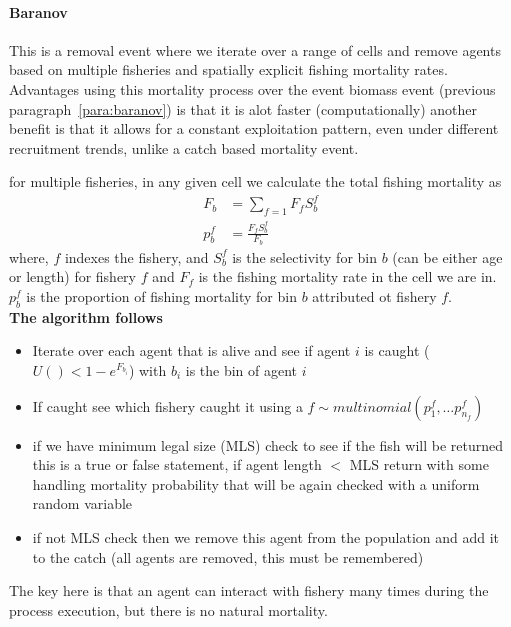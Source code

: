 \paragraph{Baranov}\label{para:event_mort_baranov}
This is a removal event where we iterate over a range of cells and remove agents based on multiple fisheries and spatially explicit fishing mortality rates. Advantages using this mortality process over the event biomass event (previous paragraph~\ref{para:baranov}) is that it is alot faster (computationally) another benefit is that it allows for a constant exploitation pattern, even under different recruitment trends, unlike a catch based mortality event.

for multiple fisheries, in any given cell we calculate the total fishing mortality as
\begin{align}
	F_b &= \sum_{f = 1} F_fS^f_b\\
	p^f_b &= \frac{F_fS^f_b}{F_b}
\end{align}
where, \(f\) indexes the fishery, and \(S^f_b\) is the selectivity for bin \(b\) (can be either age or length) for fishery \(f\) and \(F_f\) is the fishing mortality rate in the cell we are in. \(p^f_b\) is the proportion of fishing mortality for bin \(b\) attributed ot fishery \(f\).\\
\textbf{The algorithm follows}
\begin{itemize}
	\item Iterate over each agent that is alive and see if agent \(i\) is caught ($U() < 1 - e^{F_{b_i}}$) with \(b_i\) is the bin of agent \(i\)
	\item If caught see which fishery caught it using a \(f \sim multinomial(p^f_1, \dots p^f_{n_f})\)
	\item if we have minimum legal size (MLS) check to see if the fish will be returned this is a true or false statement, if agent length $<$ MLS return with some handling mortality probability that will be again checked with a uniform random variable
	\item if not MLS check then we remove this agent from the population and add it to the catch (all agents are removed, this must be remembered)
\end{itemize}
The key here is that an agent can interact with fishery many times during the process execution, but there is no natural mortality.

